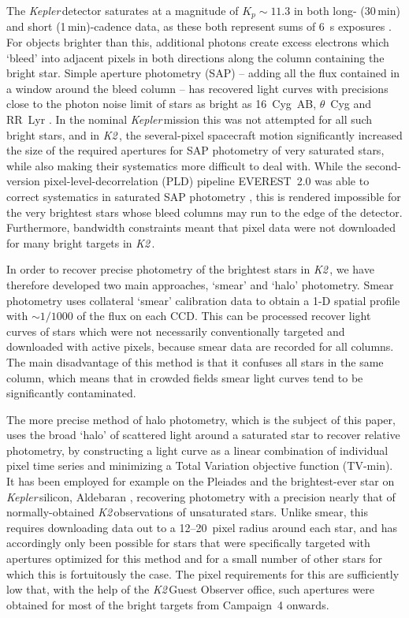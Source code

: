 \documentclass[modern]{aastex62}
\newcommand\kepler{\emph{Kepler}\,}
\newcommand\ktwo{\emph{K2}\,}
\begin{document}
The \kepler detector saturates at a magnitude of $K_p \sim 11.3$ in both long- (30\,min) and short (1\,min)-cadence data, as these both represent sums of 6~s exposures \citep{Gilliland2010}. For objects brighter than this, additional photons create excess electrons which `bleed' into adjacent pixels in both directions along the column containing the bright star. Simple aperture photometry (SAP) -- adding all the flux contained in a window around the bleed column -- has recovered light curves with precisions close to the photon noise limit of stars as bright as 16~Cyg~AB, $\theta$~Cyg and RR~Lyr \citep[e.g.][]{Kolenberg2011,2013MNRAS.433.1262W,Guzik2016}. In the nominal \kepler mission this was not attempted for all such bright stars, and in \ktwo, the several-pixel spacecraft motion significantly increased the size of the required apertures for SAP photometry of very saturated stars, while also making their systematics more difficult to deal with. While the second-version pixel-level-decorrelation (PLD) pipeline EVEREST~2.0 was able to correct systematics in saturated SAP photometry \citep{everest2}, this is rendered impossible for the very brightest stars whose bleed columns may run to the edge of the detector. Furthermore, bandwidth constraints meant that pixel data were not downloaded for many bright targets in \ktwo. 

In order to recover precise photometry of the brightest stars in \ktwo, we have therefore developed two main approaches, `smear' and `halo' photometry. Smear photometry \citep{Pope2016} uses collateral `smear' calibration data to obtain a 1-D spatial profile with $\sim 1/1000$ of the flux on each CCD. This can be processed recover light curves of stars which were not necessarily conventionally targeted and downloaded with active pixels, because smear data are recorded for all columns. The main disadvantage of this method is that it confuses all stars in the same column, which means that in crowded fields smear light curves tend to be significantly contaminated. 

The more precise method of halo photometry, which is the subject of this paper, uses the broad `halo' of scattered light around a saturated star to recover relative photometry, by constructing a light curve as a linear combination of individual pixel time series and minimizing a Total Variation objective function (TV-min). It has been employed for example on the Pleiades \citep{White2017} and the brightest-ever star on \kepler silicon, Aldebaran \citep{Farr2018}, recovering photometry with a precision nearly that of normally-obtained \ktwo observations of unsaturated stars. Unlike smear, this requires downloading data out to a 12--20~pixel radius around each star, and has accordingly only been possible for stars that were specifically targeted with apertures optimized for this method and for a small number of other stars for which this is fortuitously the case. The pixel requirements for this are sufficiently low that, with the help of the \ktwo Guest Observer office, such apertures were obtained for most of the bright targets from Campaign~4 onwards.
\end{document}
